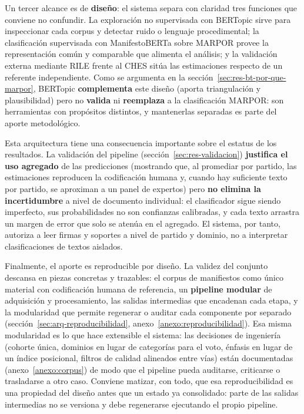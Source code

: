 Un tercer alcance es de \textbf{diseño}: el sistema separa con claridad tres
funciones que conviene no confundir. La exploración no supervisada con BERTopic
sirve para inspeccionar cada corpus y detectar ruido o lenguaje procedimental; la
clasificación supervisada con ManifestoBERTa sobre MARPOR provee la
representación común y comparable que alimenta el análisis; y la validación
externa mediante RILE frente al CHES sitúa las estimaciones respecto de un
referente independiente. Como se argumenta en la
sección~\ref{sec:res-bt-por-que-marpor}, BERTopic \textbf{complementa} este
diseño (aporta triangulación y plausibilidad) pero no \textbf{valida} ni
\textbf{reemplaza} a la clasificación MARPOR: son herramientas con propósitos
distintos, y mantenerlas separadas es parte del aporte metodológico.

Esta arquitectura tiene una consecuencia importante sobre el estatus de los
resultados. La validación del pipeline (sección~\ref{sec:res-validacion})
\textbf{justifica el uso agregado} de las predicciones (mostrando que, al
promediar por partido, las estimaciones reproducen la codificación humana y,
cuando hay suficiente texto por partido, se aproximan a un panel de
expertos) pero \textbf{no elimina la incertidumbre} a
nivel de documento individual: el clasificador sigue siendo imperfecto, sus
probabilidades no son confianzas calibradas, y cada texto arrastra un margen de
error que solo se atenúa en el agregado. El sistema, por tanto, autoriza a leer
firmas y soportes a nivel de partido y dominio, no a interpretar clasificaciones
de textos aislados.

Finalmente, el aporte es reproducible por diseño. La validez del conjunto
descansa en piezas concretas y trazables: el corpus de manifiestos como único
material con codificación humana de referencia, un \textbf{pipeline modular} de
adquisición y procesamiento, las salidas intermedias que encadenan cada etapa, y
la modularidad que permite regenerar o auditar cada componente por separado
(sección~\ref{sec:arq-reproducibilidad}, anexo~\ref{anexo:reproducibilidad}). Esa
misma modularidad es lo que hace extensible el sistema: las decisiones de
ingeniería (cohorte única, dominios en lugar de categorías para el voto,
énfasis en lugar de un índice posicional, filtros de calidad alineados entre
vías) están documentadas (anexo~\ref{anexo:corpus}) de modo que el pipeline
pueda auditarse, criticarse o trasladarse a otro caso. Conviene matizar, con todo,
que esa reproducibilidad es una propiedad del diseño antes que un estado ya
consolidado: parte de las salidas intermedias no se versiona y debe regenerarse
ejecutando el propio pipeline.

